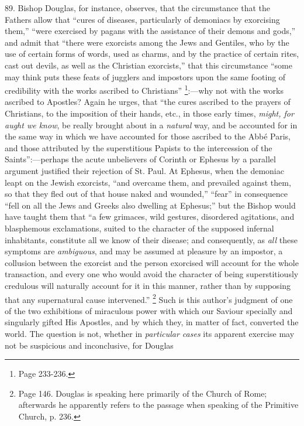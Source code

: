 89.
Bishop Douglas, for instance, observes, that the circumstance that the
Fathers allow that ``cures of diseases, particularly of demoniacs by
exorcising them,'' ``were exercised by pagans with the assistance of
their demons and gods,'' and admit that ``there were exorcists among the
Jews and Gentiles, who by the use of certain forms of words, used as
charms, and by the practice of certain rites, cast out devils, as well
as the Christian exorcists,'' that this circumstance ``some may think
puts these feats of jugglers and impostors upon the same footing
of credibility with the works ascribed to Christians'' \footnote{Page 233-236.}:—why not with the works ascribed to Apostles? Again he
urges, that ``the cures ascribed to the prayers of Christians, to the
imposition of their hands, etc., in those early times, \emph{might, for
aught we know}, be really brought about in a \emph{natural} way,
and be accounted for in the same way in which we have accounted for
those ascribed to the Abbé Paris, and those attributed by the
superstitious Papists to the intercession of the Saints'':—perhaps
the acute unbelievers of Corinth or Ephesus by a parallel argument
justified their rejection of St. Paul. At Ephesus, when the demoniac
leapt on the Jewish exorcists, ``and overcame them, and prevailed
against them, so that they fled out of that house naked and wounded,'' ``fear''
in consequence ``fell on all the Jews and Greeks also dwelling at
Ephesus;'' but the Bishop would have taught them that ``a few grimaces,
wild gestures, disordered agitations, and blasphemous exclamations,
suited to the character of the supposed infernal inhabitants,
constitute all we know of their disease; and consequently, as \emph{all}
these symptoms are \emph{ambiguous}, and may be assumed at pleasure by
an impostor, a collusion between the exorcist and the person exorcised
will account for the whole transaction, and every one who would avoid
the character of being superstitiously credulous will naturally
account for it in this manner, rather than by supposing that any
supernatural cause intervened.'' \footnote{Page 146. Douglas is speaking here primarily of the Church of Rome;
afterwards he apparently refers to the passage when speaking of the
Primitive Church, p. 236.} Such is this author's judgment of one of the two exhibitions
of miraculous power with which our Saviour specially and singularly
gifted His Apostles, and by which they, in matter of fact, converted
the world. The question is not, whether in \emph{particular cases} its
apparent exercise may not be suspicious and inconclusive, for Douglas
